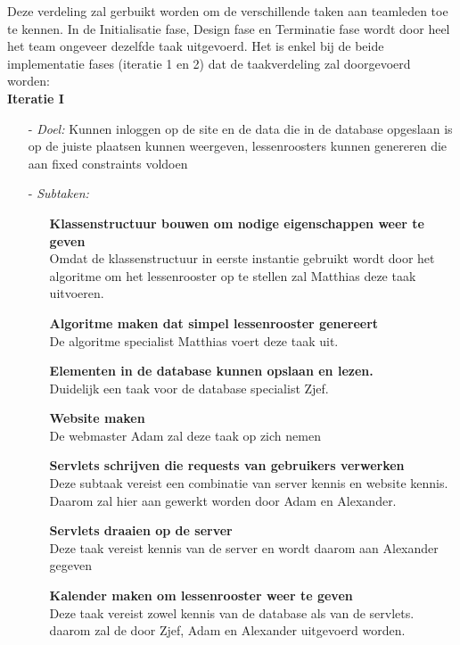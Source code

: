 \documentclass{article}
\begin{document}
Deze verdeling zal gerbuikt worden om de verschillende taken aan teamleden toe te kennen. In de Initialisatie fase, Design fase en Terminatie fase wordt door heel het team ongeveer dezelfde taak uitgevoerd. Het is enkel bij de beide implementatie fases (iteratie 1 en 2) dat de taakverdeling zal doorgevoerd worden: \\[3mm]

\textbf{\large Iteratie I}
\begin{itemize}
\item[-] \textit{Doel:} Kunnen inloggen op de site en de data die in de database opgeslaan is op de juiste plaatsen kunnen weergeven, lessenroosters kunnen genereren die aan fixed constraints voldoen\\[-5mm]
\item[-] \textit{Subtaken:} \\[-5mm]
\begin{itemize}
	\item[] \textbf{Klassenstructuur bouwen om nodige eigenschappen weer te geven} \\
	Omdat de klassenstructuur in eerste instantie gebruikt wordt door het algoritme om het lessenrooster op te stellen zal Matthias deze taak uitvoeren. \\[-5mm]
	\item[] \textbf{Algoritme maken dat simpel lessenrooster genereert} \\
	De algoritme specialist Matthias voert deze taak uit. \\[-5mm]
	\item[] \textbf{Elementen in de database kunnen opslaan en lezen.} \\
	Duidelijk een taak voor de database specialist Zjef. \\[-5mm]
	\item[] \textbf{Website maken} \\
	De webmaster Adam zal deze taak op zich nemen \\[-5mm]
	\item[] \textbf{Servlets schrijven die requests van gebruikers verwerken} \\
	Deze subtaak vereist een combinatie van server kennis en website kennis. Daarom zal hier aan gewerkt worden door Adam en Alexander. \\[-5mm]
	\item[] \textbf{Servlets draaien op de server} \\
	Deze taak vereist kennis van de server en wordt daarom aan Alexander gegeven \\[-5mm]
	\item[] \textbf{Kalender maken om lessenrooster weer te geven} \\
	Deze taak vereist zowel kennis van de database als van de servlets. daarom zal de door Zjef, Adam en Alexander uitgevoerd worden. \\[-5mm]
\end{itemize}
\end{itemize}
\end{document}
